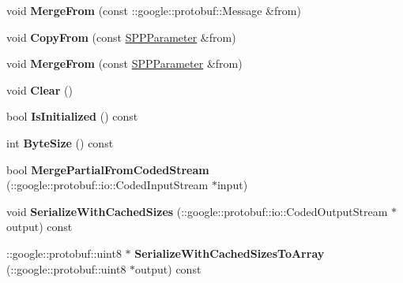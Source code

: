 \begin{DoxyCompactItemize}
void {\bfseries Merge\+From} (const \+::google\+::protobuf\+::\+Message \&from)
\item 
\mbox{\label{classcaffe_1_1_s_p_p_parameter_aaee0955c70e91973653f7488fb3508b6}} 
void {\bfseries Copy\+From} (const \mbox{\hyperlink{classcaffe_1_1_s_p_p_parameter}{S\+P\+P\+Parameter}} \&from)
\item 
\mbox{\label{classcaffe_1_1_s_p_p_parameter_a08507b17964f3e671e1385b9d75dc320}} 
void {\bfseries Merge\+From} (const \mbox{\hyperlink{classcaffe_1_1_s_p_p_parameter}{S\+P\+P\+Parameter}} \&from)
\item 
\mbox{\label{classcaffe_1_1_s_p_p_parameter_a7aede8a03e0e699d94c6f0668d7834b3}} 
void {\bfseries Clear} ()
\item 
\mbox{\label{classcaffe_1_1_s_p_p_parameter_a6597373a482c42230e975924cbcac1e0}} 
bool {\bfseries Is\+Initialized} () const
\item 
\mbox{\label{classcaffe_1_1_s_p_p_parameter_a92c93354093a1d092e27dc6b864abb1a}} 
int {\bfseries Byte\+Size} () const
\item 
\mbox{\label{classcaffe_1_1_s_p_p_parameter_aee6ad46d8a0449ee886cbe23464c4d5a}} 
bool {\bfseries Merge\+Partial\+From\+Coded\+Stream} (\+::google\+::protobuf\+::io\+::\+Coded\+Input\+Stream $\ast$input)
\item 
\mbox{\label{classcaffe_1_1_s_p_p_parameter_ae67c9836ff2c45aa7748b3cc7d6e6778}} 
void {\bfseries Serialize\+With\+Cached\+Sizes} (\+::google\+::protobuf\+::io\+::\+Coded\+Output\+Stream $\ast$output) const
\item 
\mbox{\label{classcaffe_1_1_s_p_p_parameter_a8c47f285be40eea50649e606bd950721}} 
\+::google\+::protobuf\+::uint8 $\ast$ {\bfseries Serialize\+With\+Cached\+Sizes\+To\+Array} (\+::google\+::protobuf\+::uint8 $\ast$output) const
\item 
\mbox{\label{classcaffe_1_1_s_p_p_parameter_a8aeab4d91d1ffd8c69e22d5b545bf3e9}} 

\end{DoxyCompactItemize}
